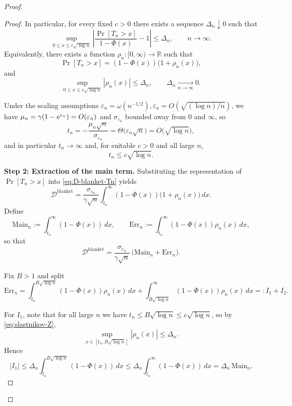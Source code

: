 \documentclass{article}
\theoremstyle{plain}
\theoremstyle{definition}
\begin{document}
\begin{proof}
\begin{proof}
In particular, for every fixed $c>0$ there exists a sequence
$\Delta_n\downarrow0$ such that
\begin{equation}
  \label{eq:slastnikov-Z}
  \sup_{0\le x\le c\sqrt{\log n}}
  \left|
    \frac{\Pr\left[T_n>x\right]}{1-\Phi(x)} - 1
  \right|
  \le \Delta_n,
  \qquad n\to\infty.
\end{equation}
Equivalently, there exists a function $\rho_n:[0,\infty)\to\mathbb R$
such that
\[
  \Pr\left[T_n>x\right] = (1-\Phi(x))\bigl(1+\rho_n(x)\bigr),
\]
and
\[
  \sup_{0\le x\le c\sqrt{\log n}}|\rho_n(x)|
  \le \Delta_n,\qquad \Delta_n\xrightarrow[n\to\infty]{}0.
\]

Under the scaling assumptions
\(
  \varepsilon_n=\omega(n^{-1/2}),
  \varepsilon_n=O(\sqrt{(\log n)/n})
\),
we have $\mu_n = \gamma(1-{\rm e}^{\varepsilon_n}) = O(\varepsilon_n)$
and $\sigma_{\varepsilon_n}$ bounded away from $0$ and $\infty$,
so
\[
  t_n
  = -\frac{\mu_n\sqrt{n}}{\sigma_{\varepsilon_n}}
  = \Theta\bigl(\varepsilon_n\sqrt{n}\bigr)
  = O\bigl(\sqrt{\log n}\bigr),
\]
and in particular $t_n\to\infty$ and, for suitable $c>0$ and all large
$n$,
\[
  t_n \le c\sqrt{\log n}.
\]

\medskip\noindent
\textbf{Step 2: Extraction of the main term.}
Substituting the representation of $\Pr\left[T_n>x\right]$ into
\eqref{eq:D-blanket-Tn} yields
\[
  \mathcal D^{\mathrm{blanket}}
  = \frac{\sigma_{\varepsilon_n}}{\gamma\sqrt{n}}
    \int_{t_n}^\infty (1-\Phi(x))\bigl(1+\rho_n(x)\bigr)\,dx.
\]
Define
\[
  \mathrm{Main}_n
  := \int_{t_n}^\infty (1-\Phi(x))\,dx,
  \qquad
  \mathrm{Err}_n
  := \int_{t_n}^\infty (1-\Phi(x))\rho_n(x)\,dx,
\]
so that
\begin{equation}
  \label{eq:D-main+err}
  \mathcal D^{\mathrm{blanket}}
  = \frac{\sigma_{\varepsilon_n}}{\gamma\sqrt{n}}\,
    \bigl(\mathrm{Main}_n + \mathrm{Err}_n\bigr).
\end{equation}

Fix $B>1$ and split
\[
  \mathrm{Err}_n
  = \int_{t_n}^{B\sqrt{\log n}} (1-\Phi(x))\rho_n(x)\,dx
    + \int_{B\sqrt{\log n}}^\infty (1-\Phi(x))\rho_n(x)\,dx
  =: I_1 + I_2.
\]

For $I_1$, note that for all large $n$ we have
$t_n\le B\sqrt{\log n}\le c\sqrt{\log n}$, so by
\eqref{eq:slastnikov-Z},
\[
  \sup_{x\in[t_n,B\sqrt{\log n}]}|\rho_n(x)|
  \le \Delta_n.
\]
Hence
\[
  |I_1|
  \le \Delta_n \int_{t_n}^{B\sqrt{\log n}} (1-\Phi(x))\,dx
  \le \Delta_n \int_{t_n}^\infty (1-\Phi(x))\,dx
  = \Delta_n\,\mathrm{Main}_n.
\]


\end{proof}
\end{proof}
\end{document}

